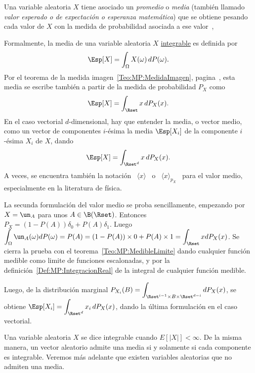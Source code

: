 Una  variable aleatoria  $X$  tiene asociado  un  {\it promedio}  o {\it  media}
(tambi\'en  llamado   {\it  valor  esperado  o  de   expectaci\'on  o  esperanza
  matem\'atica})  que se  obtiene pesando  cada valor  de $X$  con la  medida de
probabilidad asociada a ese valor~\cite{AshDol99, AthLah06},
%
\begin{definicion}
\label{Def:MP:ValorMedio}
%
  Formalmente, la media de  una variable aleatoria $X$ \underline{integrable} es
  definida por
  \[
  \Esp[X] = \int_\Omega X(\omega) \, dP(\omega).
  \]
  Por    el    teorema    de    la    medida    imagen~\ref{Teo:MP:MedidaImagen},
  pagina~\pageref{Teo:MP:MedidaImagen}, esta media  se escribe tambi\'en a partir
  de la medida de probabilidad $P_X$ como
  \[
  \Esp[X] = \int_\Rset x \, dP_X(x).
  \]
  En  el caso vectorial  $d$-dimensional, hay  que entender  la media,  o vector
  medio, como  un vector de componentes  $i$-\'esima la media  $\Esp[X_i]$ de la
  componente $i$-\'esima $X_i$ de $X$, dando
  \[
  \Esp[X] = \int_{\Rset^d} x \, dP_X(x).
  \]
  A veces,  se encuentra  tambi\'en la notaci\'on  \ $\langle  x \rangle$ \  o \
  $\langle  x  \rangle_{p_X}$  \  para  el  valor  medio,  especialmente  en  la
  literatura de f\'isica.
\end{definicion}
%
La secunda formulaci\'on  del valor medio se proba  sencillamente, empezando por
$X =  \un_A$ para unos $A \in  \B(\Rset)$.  Entonces $P_X =  (1-P(A)) \delta_0 +
P(A)  \delta_1$.  Luego  $\displaystyle \int_\Omega  \un_A(\omega)  dP(\omega) =
P(A) = (1-P(A)) \times 0 + P(A)  \times 1 = \int_\Rset x dP_X(x)$.  Se cierra la
prueba  con  el  teorema~\ref{Teo:MP:MedibleLimite}  dando  cualquier  funci\'on
medible    como     limite    de    funciones    escalonadas,     y    por    la
definici\'on~\ref{Def:MP:IntegracionReal} de la  integral de cualquier funci\'on
medible.

Luego,   de    la   distribuci\'on   marginal    $\displaystyle   P_{X_i}(B)   =
\int_{\Rset^{i-1}   \times   B   \times   \Rset^{d-i}}  dP_X(x)$,   se   obtiene
$\displaystyle  \Esp[X_i] = \int_{\Rset^d}  x_i \,  dP_X(x)$, dando  la \'ultima
formulaci\'on en el caso vectorial.

Una variable  aleatoria $X$ se dice  integrable cuando $E[|X|] <  \infty$. De la
misma  manera, un  vector aleatorio  admite  una media  si y  solamente si  cada
componente  es   integrable.  Veremos  m\'as  adelante   que  existen  variables
aleatorias que no admiten una media.

